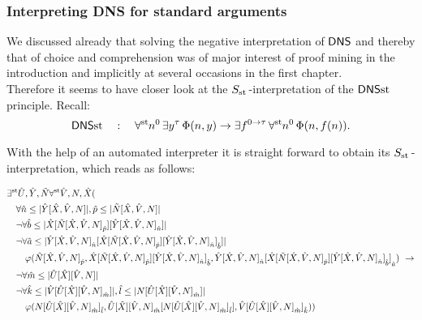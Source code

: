 \subsubsection*{Interpreting DNS for standard arguments}

We discussed already that solving the negative interpretation of $\textsf{\upshape DNS}$ and thereby that
of choice and comprehension was of major interest of proof mining in the introduction and implicitly at several occasions in the first chapter.\\
Therefore it seems to have closer look at the $\protect{S_{\operatorname{st}{}}}$-interpretation of the $\textsf{\upshape DNS}{\operatorname{st}}$ principle. Recall:
\[
\textsf{\upshape DNS}{\operatorname{st}}\quad :\quad \forall^{\operatorname{st}{}}\! n^0 \, \exists y^\tau \, \Phi(n, y) \to \exists f^{0 \to \tau} \, \forall^{\operatorname{st}{}}\! n^0 \, \Phi(n, f(n)).
\]

With the help of an automated interpreter it is straight forward to obtain 
its $\protect{S_{\operatorname{st}{}}}$-interpretation, which reads as follows:

\begin{small}
\begin{align*}
 &\exists^{\operatorname{st}{}}\! \hat U,\hat Y,\tilde N\forall^{\operatorname{st}{}}\! \hat V,N,\hat X( \\ 
 &\quad \forall \hat n\leq |\hat Y[\hat X,\hat V,N]|, 
                \hat p\leq |\tilde N[\hat X,\hat V,N]| \\
 &\quad \neg\forall \hat b\leq |\hat X[{\tilde N[\hat X,\hat V,N]}_{\hat p}][{\hat Y[\hat X,\hat V,N]}_{\hat n}]| \\
 &\quad \neg\forall \hat a\leq |{\hat Y[\hat X,\hat V,N]}_{\hat n}[{\hat X[{\tilde N[\hat X,\hat V,N]}_{\hat p}][{\hat Y[\hat X,\hat V,N]}_{\hat n}]}_{\hat b}]| \\ 
 &\quad\quad 
    \varphi({\tilde N[\hat X,\hat V,N]}_{\hat p},{\hat X[{\tilde N[\hat X,\hat V,N]}_{\hat p}][{\hat Y[\hat X,\hat V,N]}_{\hat n}]}_{\hat b},{{\hat Y[\hat X,\hat V,N]}_{\hat n}[{\hat X[{\tilde N[\hat X,\hat V,N]}_{\hat p}][{\hat Y[\hat X,\hat V,N]}_{\hat n}]}_{\hat b}]}_{\hat a})\ \rightarrow\\
 &\quad \neg\forall \hat m\leq |\hat U[\hat X][\hat V,N]|\\
 &\quad \neg\forall \hat k\leq |\hat V[{\hat U[\hat X][\hat V,N]}_{\hat m}]|,\hat l\leq |N[{\hat U[\hat X][\hat V,N]}_{\hat m}]| \\ 
 &\quad\quad \varphi({N[{\hat U[\hat X][\hat V,N]}_{\hat m}]}_{\hat l},{\hat U[\hat X][\hat V,N]}_{\hat m}[{N[{\hat U[\hat X][\hat V,N]}_{\hat m}]}_{\hat l}],{\hat V[{\hat U[\hat X][\hat V,N]}_{\hat m}]}_{\hat k}))
\end{align*}
\end{small}
